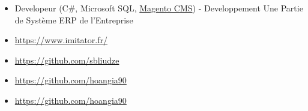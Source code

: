 \documentclass[10pt,a4paper,ragged2e]{altacv}
\begin{document}
	\divider
	
	\begin{itemize}
		\item Developeur (C\#, Microsoft SQL, \href{https://magento.com/}{Magento CMS}) - Developpement Une Partie de Système ERP de l'Entreprise
	\end{itemize}
	
	\clearpage
	
	
	
	{}{}
	\begin{itemize}
		\item \href{IMITATOR}{https://www.imitator.fr/}
	\end{itemize}
	
	\divider
	
	{}{}
	\begin{itemize}
		\item \href{https://github.com/sbliudze}{https://github.com/sbliudze}
		\item \href{https://github.com/hoangia90}{https://github.com/hoangia90}
	\end{itemize}

	\divider
	
	{}{}
	\begin{itemize}
		\item \href{https://github.com/hoangia90}{https://github.com/hoangia90}
	\end{itemize}
	
	
	
	
	\nocite{*}
	
%	
%	
%	
%	
	
\end{document}
